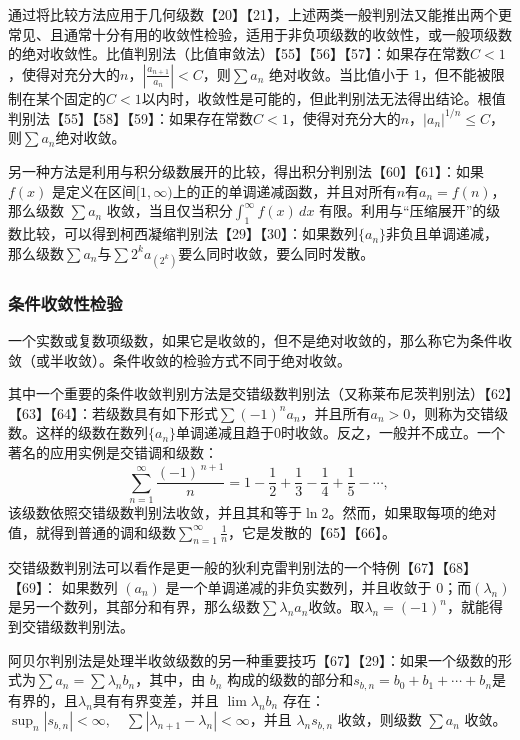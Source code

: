 通过将比较方法应用于几何级数【20】【21】，上述两类一般判别法又能推出两个更常见、且通常十分有用的收敛性检验，适用于非负项级数的收敛性，或一般项级数的绝对收敛性。比值判别法（比值审敛法）【55】【56】【57】：如果存在常数$C < 1$，使得对充分大的$n$，$\left|\frac{a_{n+1}}{a_{n}}\right| < C$，则$\sum a_{n}$ 绝对收敛。当比值小于 1，但不能被限制在某个固定的$C < 1$以内时，收敛性是可能的，但此判别法无法得出结论。根值判别法【55】【58】【59】：如果存在常数$C < 1$，使得对充分大的$n$，$|a_{n}|^{1/n} \leq C$，则$\sum a_{n}$绝对收敛。

另一种方法是利用与积分级数展开的比较，得出积分判别法【60】【61】：如果 $f(x)$ 是定义在区间$[1,\infty)$上的正的单调递减函数，并且对所有$n$有$a_{n} = f(n)$，那么级数 $\sum a_{n}$ 收敛，当且仅当积分$\int_{1}^{\infty} f(x)\,dx$
有限。利用与“压缩展开”的级数比较，可以得到柯西凝缩判别法【29】【30】：如果数列$\{a_{n}\}$非负且单调递减，那么级数$\sum a_{n}$与$\sum 2^{k} a_{(2^{k})}$要么同时收敛，要么同时发散。
\subsubsection{条件收敛性检验}
一个实数或复数项级数，如果它是收敛的，但不是绝对收敛的，那么称它为条件收敛（或半收敛）。条件收敛的检验方式不同于绝对收敛。

其中一个重要的条件收敛判别方法是交错级数判别法（又称莱布尼茨判别法）【62】【63】【64】：若级数具有如下形式$\sum (-1)^{n} a_{n}$，并且所有$a_{n} > 0$，则称为交错级数。这样的级数在数列$\{a_{n}\}$单调递减且趋于0时收敛。反之，一般并不成立。一个著名的应用实例是交错调和级数：
$$
\sum_{n=1}^{\infty} \frac{(-1)^{\,n+1}}{n} 
= 1 - \frac{1}{2} + \frac{1}{3} - \frac{1}{4} + \frac{1}{5} - \cdots ,~
$$
该级数依照交错级数判别法收敛，并且其和等于$\ln 2$。然而，如果取每项的绝对值，就得到普通的调和级数$\sum_{n=1}^{\infty} \frac{1}{n}$，它是发散的【65】【66】。

交错级数判别法可以看作是更一般的狄利克雷判别法的一个特例【67】【68】【69】：
如果数列 $(a_{n})$ 是一个单调递减的非负实数列，并且收敛于 0；而$(\lambda_{n})$ 是另一个数列，其部分和有界，那么级数$\sum \lambda_{n} a_{n}$收敛。取$\lambda_{n} = (-1)^{n}$，就能得到交错级数判别法。

阿贝尔判别法是处理半收敛级数的另一种重要技巧【67】【29】：如果一个级数的形式为$
\sum a_{n} = \sum \lambda_{n} b_{n}$，其中，由 $b_{n}$ 构成的级数的部分和$s_{b,n} = b_{0} + b_{1} + \cdots + b_{n}$是有界的，且$\lambda_{n}$具有有界变差，并且 $\lim \lambda_{n} b_{n}$ 存在：$\sup_{n}|s_{b,n}| < \infty,\quad \sum |\lambda_{n+1} - \lambda_{n}| < \infty$，并且 $\lambda_{n} s_{b,n}$ 收敛，则级数 $\sum a_{n}$ 收敛。

